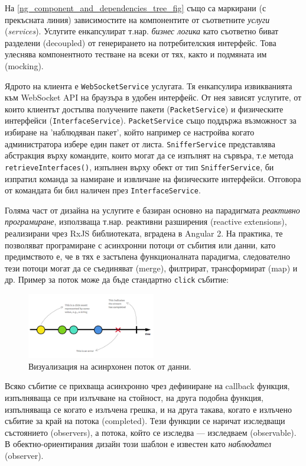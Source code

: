 \documentclass[12pt,a4paper,oneside]{book}
\begin{document}
На \autoref{ng_component_and_dependencies_tree_fig} също са маркирани
(с прекъсната линия) зависимостите на компонентите от съответните
\textit{услуги} (\textit{services}). Услугите енкапсулират т.нар.
\textit{бизнес логика} като съответно биват разделени (decoupled) от
генерирането на потребителския интерфейс. Това улеснява компонентното тестване
на всеки от тях, както и подмяната им (mocking).

Ядрото на клиента е \texttt{WebSocketService} услугата. Тя енкапсулира
извикванията към WebSocket API на браузъра в удобен интерфейс. От нея зависят
услугите, от които клиентът достъпва получените пакети (\texttt{PacketService}) и
физическите интерфейси (\texttt{InterfaceService}). \texttt{PacketService} също поддържа
възможност за избиране на 'наблюдяван пакет', който например се настройва
когато администратора избере един пакет от листа. \texttt{SnifferService}
представлява абстракция върху командите, които могат да се изпълнят на сървъра,
т.е метода \texttt{retrieveInterfaces()}, изпълнен върху обект от тип
\texttt{SnifferService}, би изпратил команда за намиране и извличане на
физическите интерфейси. Отговора от командата би бил наличен през
\texttt{InterfaceService}.

Голяма част от дизайна на услугите е базиран основно на
парадигмата \textit{реактивно програмиране}, използваща т.нар.
реактивни разширения (reactive extensions), реализирани чрез
RxJS библиотеката, вградена в Angular 2. На практика,
те позволяват програмиране с асинхронни потоци от събития или данни,
като предимството е, че в тях е застъпена функционалната парадигма,
следователно тези потоци могат да се съединяват (merge), филтрират,
трансформират (map) и др. Пример за поток може да бъде стандартно \texttt{click}
събитие:

\begin{figure}[h!]
  \centering
  \includegraphics[width=0.5\textwidth]{figures/observable.png}
  \caption{Визуализация на асинрхонен поток от данни.}
  \label{observable_fig}
\end{figure}

Всяко събитие се прихваща асинхронно чрез дефиниране на callback
функция, изпълняваща се при излъчване на стойност, на друга подобна
функция, изпълняваща се когато е излъчена грешка, и на друга такава,
когато е излъчено събитие за край
на потока (completed). Тези функции се наричат изследващи състоянието
(observers), а потока, който се изследва --- изследваем (observable). В
обектно-ориентирания дизайн този шаблон е известен като \textit{наблюдател}
(observer). \cite{gamma_design_1995}
\end{document}
